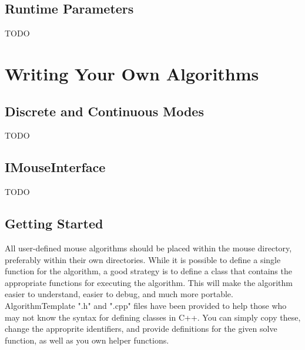 \documentclass[12pt]{article}
\begin{document}
\subsection{Runtime Parameters}

TODO

\section{Writing Your Own Algorithms}


\subsection{Discrete and Continuous Modes}

TODO

\subsection{IMouseInterface}

TODO

%
%

\subsection{Getting Started}

All user-defined mouse algorithms should be placed within the mouse directory,
preferably within their own directories. While it is possible to define a
single function for the algorithm, a good strategy is to define a class that
contains the appropriate functions for executing the algorithm. This will make
the algorithm easier to understand, easier to debug, and much more portable.
AlgorithmTemplate ".h" and ".cpp" files have been provided to help those who
may not know the syntax for defining classes in C++. You can simply copy these,
change the approprite identifiers, and provide definitions for the given solve
function, as well as you own helper functions.
\end{document}

